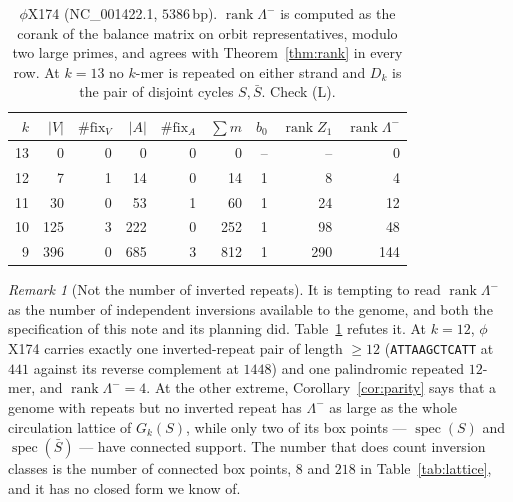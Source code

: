 \documentclass[11pt]{article}
\theoremstyle{plain}
\theoremstyle{definition}
\theoremstyle{remark}
\newtheorem{remark}[theorem]{Remark}
\newcommand{\rank}{\operatorname{rank}}
\newcommand{\spec}{\operatorname{spec}}
\newcommand{\Lm}{\Lambda^{-}}
\begin{document}
\begin{table}[t]
\centering
\begin{tabular}{rrrrrrrrr}
\toprule
$k$ & $|V|$ & $\#\mathrm{fix}_V$ & $|A|$ & $\#\mathrm{fix}_A$ & $\sum m$ & $b_0$ &
$\rank Z_1$ & $\rank\Lm$\\
\midrule
13 &   0 & 0 &   0 & 0 &   0 & -- & -- & 0\\
12 &   7 & 1 &  14 & 0 &  14 & 1 &   8 &   4\\
11 &  30 & 0 &  53 & 1 &  60 & 1 &  24 &  12\\
10 & 125 & 3 & 222 & 0 & 252 & 1 &  98 &  48\\
 9 & 396 & 0 & 685 & 3 & 812 & 1 & 290 & 144\\
\bottomrule
\end{tabular}
\caption{$\phi$X174 (NC\_001422.1, $5386$\,bp). $\rank\Lm$ is computed as the corank of the
balance matrix on orbit representatives, modulo two large primes, and agrees with
Theorem~\ref{thm:rank} in every row. At $k=13$ no $k$-mer is repeated on either strand and
$D_k$ is the pair of disjoint cycles $S,\bar S$. Check (L).}
\label{tab:rank}
\end{table}

\begin{remark}[Not the number of inverted repeats]\label{rem:notIR}
It is tempting to read $\rank\Lm$ as the number of independent inversions available to the
genome, and both the specification of this note and its planning did. Table~\ref{tab:rank}
refutes it. At $k=12$, $\phi$X174 carries exactly one inverted-repeat pair of length $\ge12$
(\texttt{ATTAAGCTCATT} at $441$ against its reverse complement at $1448$) and one palindromic
repeated $12$-mer, and $\rank\Lm=4$. At the other extreme, Corollary~\ref{cor:parity} says
that a genome with repeats but no inverted repeat has $\Lm$ as large as the whole circulation
lattice of $G_k(S)$, while only two of its box points --- $\spec(S)$ and $\spec(\bar S)$ ---
have connected support. The number that does count inversion classes is the number of
connected box points, $8$ and $218$ in Table~\ref{tab:lattice}, and it has no closed form we
know of.
\end{remark}
\end{document}
